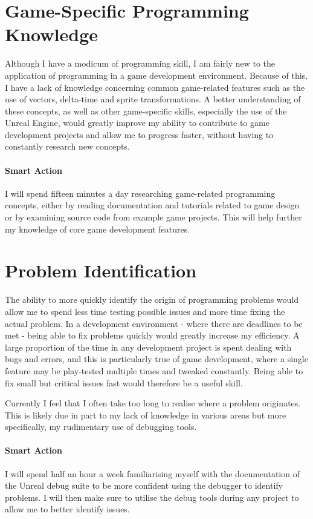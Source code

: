 \documentclass{scrartcl}
\begin{document}
\section{Game-Specific Programming Knowledge}

Although I have a modicum of programming skill, I am fairly new to the application of programming in a game development environment. Because of this, I have a lack of knowledge concerning common game-related features such as the use of vectors, delta-time and sprite transformations. A better understanding of these concepts, as well as other game-specific skills, especially the use of the Unreal Engine, would greatly improve my ability to contribute to game development projects and allow me to progress faster, without having to constantly research new concepts.

\paragraph{Smart Action} I will spend fifteen minutes a day researching game-related programming concepts, either by reading documentation and tutorials related to game design or by examining source code from example game projects. This will help further my knowledge of core game development features.


\section{Problem Identification}

The ability to more quickly identify the origin of programming problems would allow me to spend less time testing possible issues and more time fixing the actual problem. In a development environment - where there are deadlines to be met - being able to fix problems quickly would greatly increase my efficiency. A large proportion of the time in any development project is spent dealing with bugs and errors, and this is particularly true of game development, where a single feature may be play-tested multiple times and tweaked constantly. Being able to fix small but critical issues fast would therefore be a useful skill. 

Currently I feel that I often take too long to realise where a problem originates. This is likely due in part to my lack of knowledge in various areas but more specifically, my rudimentary use of debugging tools. 

\paragraph{Smart Action} I will spend half an hour a week familiarising myself with the documentation of the Unreal debug suite to be more confident using the debugger to identify problems. I will then make sure to utilise the debug tools during any project to allow me to better identify issues.
\end{document}
